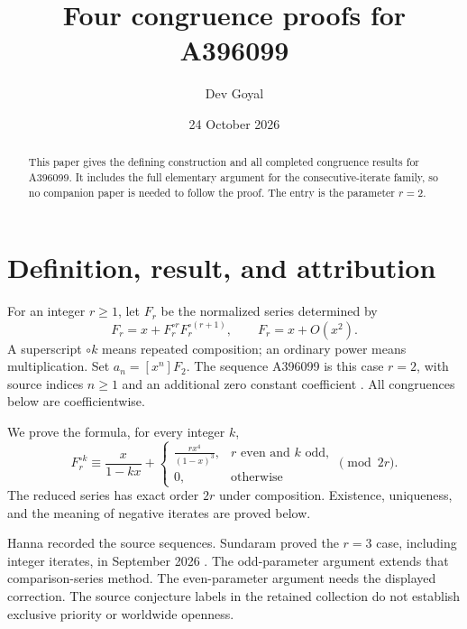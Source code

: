 \documentclass[11pt,a4paper]{article}
\title{Four congruence proofs for A396099}
\author{Dev Goyal}
\date{24 October 2026}
\theoremstyle{remark}\newtheorem{remark}[theorem]{Remark}
\begin{document}
\maketitle
\begin{center}\end{center}

\begin{abstract}
This paper gives the defining construction and all completed congruence
results for A396099. It includes the full elementary argument for the
consecutive-iterate family, so no companion paper is needed to follow the
proof. The entry is the parameter $r=2$.
\end{abstract}
\section{Definition, result, and attribution}
For an integer $r\ge1$, let $F_r$ be the normalized series determined by
\begin{equation}\label{eq:family}
 F_r=x+F_r^{\circ r}F_r^{\circ(r+1)},\qquad F_r=x+O(x^2).
\end{equation}
A superscript $\circ k$ means repeated composition; an ordinary power
means multiplication. Set $a_n=[x^n]F_{2}$.
The sequence A396099 is this case $r=2$, with source
indices $n\ge1$ and an additional zero constant coefficient \cite{oeis}.
All congruences below are coefficientwise.

We prove the formula, for every integer $k$,
\[
F_r^{\circ k}\equiv
\frac{x}{1-kx}+
\begin{cases}
\displaystyle\frac{rx^4}{(1-x)^3},&r\text{ even and }k\text{ odd},\\[5pt]
0,&\text{otherwise}
\end{cases}
\pmod{2r}.
\]
The reduced series has exact order $2r$ under composition. Existence,
uniqueness, and the meaning of negative iterates are proved below.

Hanna recorded the source sequences. Sundaram proved the $r=3$ case,
including integer iterates, in September 2026 \cite{sundaram}. The
odd-parameter argument extends that comparison-series method.
The even-parameter argument needs the displayed correction. The source
conjecture labels in the retained collection do not establish exclusive
priority or worldwide openness.
\end{document}
